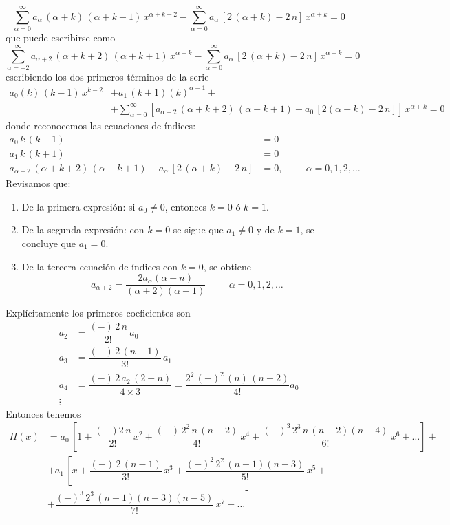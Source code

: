 \[ \sum_{\alpha = 0}^{\infty} a_{\alpha} \, (\alpha + k) \, (\alpha + k - 1) \, x^{\alpha+k-2} - \sum_{\alpha=0}^{\infty} a_{\alpha} \, [ 2 \, (\alpha + k) - 2 \, n] \, x^{\alpha+k} = 0 \]
que puede escribirse como
\[ \sum_{\alpha=-2}^{\infty} a_{\alpha + 2} \, ( \alpha + k + 2) \, (\alpha + k + 1)\, x^{\alpha+k} - \sum_{\alpha=0}^{\infty} a_{\alpha} \, [2 \, (\alpha + k) - 2 \, n] \, x^{\alpha+k} = 0 \]
escribiendo los dos primeros términos de la serie
\begin{align*}
 a_{0}(k) \, (k - 1)\, x^{k-2} &+ a_{1} \, (k + 1)(k)^{\alpha-1} + \\
&+ \sum_{\alpha=0}^{\infty} \left[ a_{\alpha + 2} \, (\alpha + k +2) \, (\alpha + k + 1) - a_{0} \, [2 (\alpha + k ) - 2 \, n] \right] \, x^{\alpha+k} = 0 
\end{align*}
donde reconocemos las ecuaciones de índices:
\begin{align*}
a_{0}\, k \, (k-1) &= 0 \\
a_{1} \, k\, (k+1) &= 0 \\
a_{\alpha+2}\, (\alpha + k + 2) \, (\alpha + k + 1) - a_{\alpha} \, [2 \, (\alpha + k) - 2 \, n] &= 0, \hspace{1cm} \alpha=0, 1, 2, \ldots
\end{align*}
Revisamos que:
\begin{enumerate}
\item De la primera expresión: si $a_{0} \neq 0$, entonces $k=0$ ó $k=1$.
\item De la segunda expresión: con $k=0$ se sigue que $a_{1} \neq 0$ y de $k=1$, se concluye que $a_{1} = 0$.
\item De la tercera ecuación de índices con $k=0$, se obtiene
\[ a_{\alpha+2} = \dfrac{2a_{\alpha}(\alpha - n)}{(\alpha + 2)(\alpha + 1)} \hspace{1cm} \alpha = 0, 1, 2, \ldots \]
\end{enumerate}
Explícitamente los primeros coeficientes son
\begin{align*}
a_{2} &= \dfrac{(-) \, 2 \, n}{2!} \, a_{0} \\
a_{3} &= \dfrac{(-) \, 2 \, (n-1)}{3!} \, a_{1} \\
a_{4} &= \dfrac{(-) \, 2 \, a_{2} \, (2 - n)}{4 \times 3} = \dfrac{2^{2} \, (-)^{2} \, (n) \, (n - 2)}{4!} a_{0} \\
\vdots
\end{align*}
Entonces tenemos
\begin{align*}
H(x) &= a_{0} \, \left[ 1 + \dfrac{(-) 2 \, n}{2!}\, x^{2} + \dfrac{(-) \, 2^{2} \, n \, (n - 2)}{4!}\, x^{4} + \dfrac{(-)^{3} \, 2^{3} \, n \, (n-2)(n-4) }{6!}\, x^{6} + \ldots \right] + \\
&+ a_{1} \, \left[ x + \dfrac{(-) \, 2 \, (n-1)}{3!} \, x^{3} + \dfrac{(-)^{2} \, 2^{2} \, (n-1)(n-3)}{5!}\, x^{5} + \right.\\
&+ \left. \dfrac{(-)^{3} \, 2^{3} \, (n-1)(n-3)(n-5)}{7!} \, x^{7} + \ldots \right]
\end{align*}

